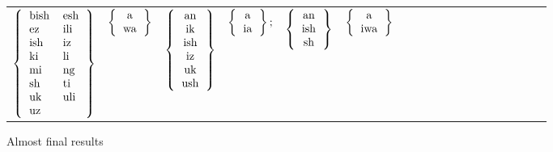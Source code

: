 \documentclass[output=paper,colorlinks,citecolor=brown]{langscibook}
\begin{document}
   
\begin{figure}
\begin{tabular}{lllllllllllllllllll} 
$ \left\{ \begin{tabular}{ll} bish &  esh     \\ ez  &  ili \\ ish  & iz \\ki  & li\\mi & ng\\sh  &  ti\\ uk  &  uli \\ uz \end{tabular} \right\} $& $\left\{ \begin{tabular}{c}  a \\ wa \end{tabular} \right\}  $  &
$ \left\{ \begin{tabular}{c}  an     \\ ik \\ ish \\ iz \\ uk \\ush  \end{tabular} \right\} $&$ \left\{ \begin{tabular}{c}  a \\ ia \end{tabular} \right\}   ;$ &
$ \left\{ \begin{tabular}{c}  an     \\ ish \\ sh    \end{tabular} \right\} $& $\left\{ \begin{tabular}{c}  a \\ iwa \end{tabular} \right\} $   \\
\end{tabular}
\caption{Almost final results}
\label{finalsigs1}
\end{figure}

\vspace{.2in}
\end{document}

